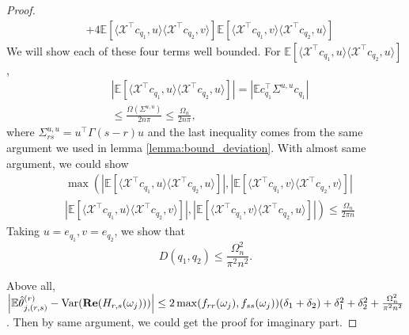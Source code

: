 \begin{proof}
\begin{equation}
\begin{aligned}
&+4\mathbb{E} \left[ \langle \mathcal{X}^\top  c_{q_1}, u \rangle  \langle \mathcal{X}^\top  c_{q_2}, v \rangle \right]\mathbb{E} \left[ \langle \mathcal{X}^\top  c_{q_1}, v \rangle  \langle \mathcal{X}^\top  c_{q_2}, u \rangle \right]
\end{aligned}
\end{equation}
We will show each of these four terms well bounded. For $\mathbb{E} \left[ \langle \mathcal{X}^\top  c_{q_1}, u \rangle  \langle \mathcal{X}^\top  c_{q_2}, u \rangle \right]$, 
\begin{equation}
\begin{aligned}
&|\mathbb{E} \left[ \langle \mathcal{X}^\top  c_{q_1}, u \rangle  \langle \mathcal{X}^\top  c_{q_2}, u \rangle\right]| = |\mathbb{E} c_{q_1}^\top   \Sigma^{u, u} c_{q_1}| \\
& \le \frac{\Omega(\Sigma^{u, u})}{2n\pi} \le \frac{\Omega_n}{2n\pi},
\end{aligned}
\end{equation}
where $\Sigma^{u, u}_{rs} = u^\top   \Gamma(s-r)u$ and the last inequality comes from the same argument we used in lemma \ref{lemma:bound_deviation}.
With almost same argument, we could show 
\begin{equation}
\begin{aligned}
&\max\left(\left|\mathbb{E} \left[ \langle \mathcal{X}^\top  c_{q_1}, u \rangle  \langle \mathcal{X}^\top  c_{q_2}, u \rangle \right]\right|,  \left|\mathbb{E} \left[ \langle \mathcal{X}^\top  c_{q_1}, v \rangle  \langle \mathcal{X}^\top  c_{q_2}, v \rangle \right]\right|\right.\\
&\left. \left|\mathbb{E} \left[ \langle \mathcal{X}^\top  c_{q_1}, u \rangle  \langle \mathcal{X}^\top  c_{q_2}, v \rangle \right]\right|, \left|\mathbb{E} \left[ \langle \mathcal{X}^\top  c_{q_1}, v \rangle  \langle \mathcal{X}^\top  c_{q_2}, u \rangle \right]\right|\right) \le \frac{\Omega_n}{2\pi n}
\end{aligned}
\end{equation}
Taking $u= e_{q_1}, v= e_{q_2}$, we show that 
\begin{equation}
D(q_1,q_2) \le \frac{\Omega_n^2}{\pi^2n^2}. 
\end{equation}

Above all, $\left |\mathbb{E} \hat{\theta}^{(r)}_{j,(r,s)}-\mbox{Var}({\bf Re}(H_{r,s}(\omega_j)))\right| \le 2\max(f_{rr}(\omega_j),f_{ss}(\omega_j))(\delta_1+\delta_2)+\delta_1^2+\delta_2^2+\frac{\Omega_n^2}{\pi^2n^2}$. Then by same argument, we could get the proof for imaginary part. 
\end{proof}

